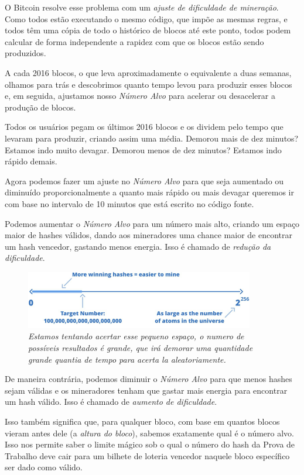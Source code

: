 O Bitcoin resolve esse problema com um \textit{ajuste de dificuldade de mineração}. Como todos estão executando o mesmo código, que impõe as mesmas regras, e todos têm uma cópia de todo o histórico de blocos até este ponto, todos podem calcular de forma independente a rapidez com que os blocos estão sendo produzidos.

A cada 2016 blocos, o que leva aproximadamente o equivalente a duas semanas, olhamos para trás e descobrimos quanto tempo levou para produzir esses blocos e, em seguida, ajustamos nosso \textit{Número Alvo} para acelerar ou desacelerar a produção de blocos.

Todos os usuários pegam os últimos 2016 blocos e os dividem pelo tempo que levaram para produzir, criando assim uma média. Demorou mais de dez minutos? Estamos indo muito devagar. Demorou menos de dez minutos? Estamos indo rápido demais.

Agora podemos fazer um ajuste no \textit{Número Alvo} para que seja aumentado ou diminuído proporcionalmente a quanto mais rápido ou mais devagar queremos ir com base no intervalo de 10 minutos que está escrito no código fonte.

Podemos aumentar o \textit{Número Alvo} para um número mais alto, criando um espaço maior de hashes válidos, dando aos mineradores uma chance maior de encontrar um hash vencedor, gastando menos energia. Isso é chamado de \textit{redução da dificuldade}.

\begin{figure}
  \centering
  \includegraphics[width=10cm]{imagens/capitulo5/difficulty2.png}
  \caption*{\textit{\small Estamos tentando acertar esse pequeno espaço, o numero de possíveis resultados é grande, que irá demorar uma quantidade grande quantia de tempo para acerta la aleatoriamente.}}
\end{figure}

 De maneira contrária, podemos diminuir o \textit{Número Alvo} para que menos hashes sejam válidas e os mineradores tenham que gastar mais energia para encontrar um hash válido. Isso é chamado de \textit{aumento de dificuldade}.

Isso também significa que, para qualquer bloco, com base em quantos blocos vieram antes dele (a \textit{altura do bloco}), sabemos exatamente qual é o número alvo. Isso nos permite saber o limite mágico sob o qual o número do hash da Prova de Trabalho deve cair para um bilhete de loteria vencedor naquele bloco específico ser dado como válido.


